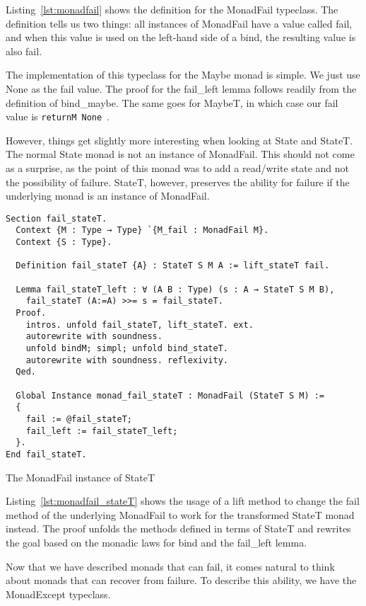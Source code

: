 Listing~\ref{lst:monadfail} shows the definition for the MonadFail typeclass.
The definition tells us two things: all instances of MonadFail have a value
called fail, and when this value is used on the left-hand side of a bind, the
resulting value is also fail.

The implementation of this typeclass for the Maybe monad is simple. We just use
None as the fail value. The proof for the fail\_left lemma follows readily from
the definition of bind\_maybe. The same goes for MaybeT, in which case our fail
value is \texttt{returnM None }.

However, things get slightly more interesting when looking at State and StateT.
The normal State monad is not an instance of MonadFail. This should not come as
a surprise, as the point of this monad was to add a read/write state and not
the possibility of failure. StateT, however, preserves the ability for failure
if the underlying monad is an instance of MonadFail.

\begin{listing}
\begin{verbatim}
Section fail_stateT.
  Context {M : Type → Type} `{M_fail : MonadFail M}.
  Context {S : Type}.

  Definition fail_stateT {A} : StateT S M A := lift_stateT fail.

  Lemma fail_stateT_left : ∀ (A B : Type) (s : A → StateT S M B),
    fail_stateT (A:=A) >>= s = fail_stateT.
  Proof.
    intros. unfold fail_stateT, lift_stateT. ext. 
    autorewrite with soundness. 
    unfold bindM; simpl; unfold bind_stateT. 
    autorewrite with soundness. reflexivity.
  Qed.

  Global Instance monad_fail_stateT : MonadFail (StateT S M) :=
  {
    fail := @fail_stateT;
    fail_left := fail_stateT_left;
  }.
End fail_stateT.
\end{verbatim}
\caption{The MonadFail instance of StateT}
\label{lst:monadfail_stateT}
\end{listing}

Listing~\ref{lst:monadfail_stateT} shows the usage of a lift method to change
the fail method of the underlying MonadFail to work for the transformed StateT
monad instead. The proof unfolds the methods defined in terms of StateT and
rewrites the goal based on the monadic laws for bind and the fail\_left lemma.

Now that we have described monads that can fail, it comes natural to think
about monads that can recover from failure. To describe this ability, we have
the MonadExcept typeclass.

